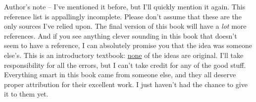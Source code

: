 



\newpage
\noindent
\hrulefill
\vspace*{24pt}

\noindent
Author's note -- I've mentioned it before, but I'll quickly mention it again. This reference list is appallingly incomplete. Please don't assume that these are the only sources I've relied upon. The final version of this book will have a {\it lot} more references. And if you see anything clever sounding in this book that doesn't seem to have a reference, I can absolutely promise you that the idea was someone else's. This is an introductory textbook: \underline{none} of the ideas are original. I'll take responsibility for all the errors, but I can't take credit for any of the good stuff. Everything smart in this book came from someone else, and they all deserve proper attribution for their excellent work. I just haven't had the chance to give it to them yet.


